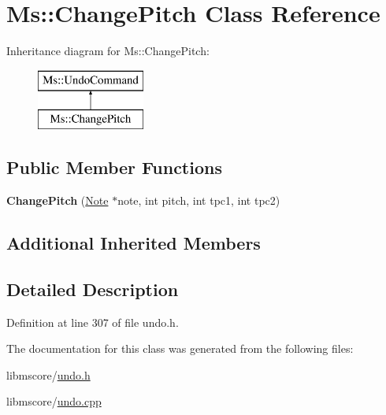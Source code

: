 \hypertarget{class_ms_1_1_change_pitch}{}\section{Ms\+:\+:Change\+Pitch Class Reference}
\label{class_ms_1_1_change_pitch}
Inheritance diagram for Ms\+:\+:Change\+Pitch\+:\begin{figure}[H]
\begin{center}
\leavevmode
\includegraphics[height=2.000000cm]{class_ms_1_1_change_pitch}
\end{center}
\end{figure}
\subsection*{Public Member Functions}
\begin{DoxyCompactItemize}
\item 
\mbox{\label{class_ms_1_1_change_pitch_ac3d9031c142edba1a0714ebeecaf5b58}} 
{\bfseries Change\+Pitch} (\hyperlink{class_ms_1_1_note}{Note} $\ast$note, int pitch, int tpc1, int tpc2)
\end{DoxyCompactItemize}
\subsection*{Additional Inherited Members}


\subsection{Detailed Description}


Definition at line 307 of file undo.\+h.



The documentation for this class was generated from the following files\+:\begin{DoxyCompactItemize}
\item 
libmscore/\hyperlink{undo_8h}{undo.\+h}\item 
libmscore/\hyperlink{undo_8cpp}{undo.\+cpp}\end{DoxyCompactItemize}
